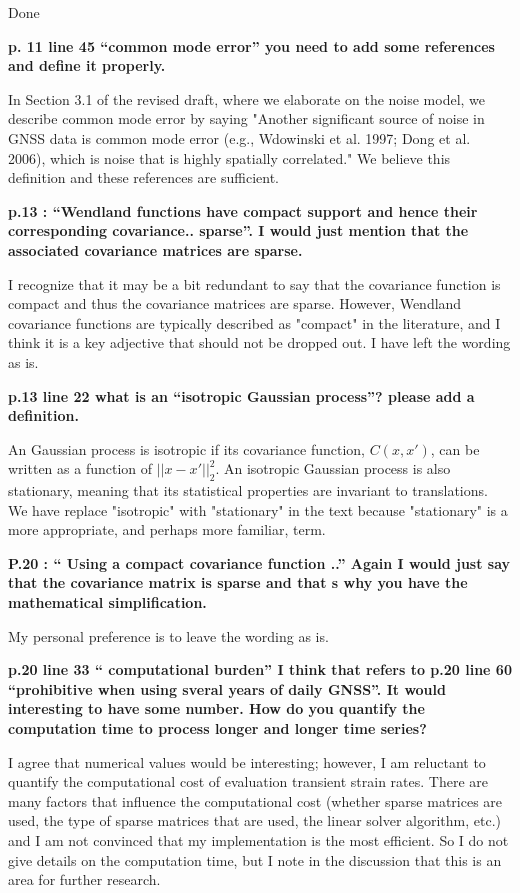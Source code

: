 \documentclass[10pt,a4paper]{letter}
\begin{document}
\begin{letter}{}
Done

\textbf{p. 11 line 45 “common mode error” you need to add some references and
define it properly.}

In Section 3.1 of the revised draft, where we elaborate on the noise
model, we describe common mode error by saying "Another significant
source of noise in GNSS data is common mode error (e.g., Wdowinski et
al. 1997; Dong et al. 2006), which is noise that is highly spatially
correlated." We believe this definition and these references are
sufficient.

\textbf{p.13 : “Wendland functions have compact support and hence their
corresponding covariance.. sparse”. I would just mention that the
associated covariance matrices are sparse.}

I recognize that it may be a bit redundant to say that the covariance
function is compact and thus the covariance matrices are sparse.
However, Wendland covariance functions are typically described as
"compact" in the literature, and I think it is a key adjective that
should not be dropped out. I have left the wording as is.

\textbf{p.13 line 22 what is an “isotropic Gaussian process”? please add a
definition.}

An Gaussian process is isotropic if its covariance function,
$C(x,x')$, can be written as a function of $||x - x'||_2^2$. An
isotropic Gaussian process is also stationary, meaning that its
statistical properties are invariant to translations. We have replace
"isotropic" with "stationary" in the text because "stationary" is a
more appropriate, and perhaps more familiar, term.

\textbf{P.20 : “ Using a compact covariance function ..” Again I would just
say that the covariance matrix is sparse and that s why you have the
mathematical simplification.}

My personal preference is to leave the wording as is.

\textbf{p.20 line 33 “ computational burden” I think that refers to p.20 line
60 “prohibitive when using sveral years of daily GNSS”. It would
interesting to have some number. How do you quantify the computation
time to process longer and longer time series?}

I agree that numerical values would be interesting; however, I am
reluctant to quantify the computational cost of evaluation transient
strain rates. There are many factors that influence the computational
cost (whether sparse matrices are used, the type of sparse matrices
that are used, the linear solver algorithm, etc.) and I am not
convinced that my implementation is the most efficient. So I do not
give details on the computation time, but I note in the discussion
that this is an area for further research.



\end{letter}
\end{document}
